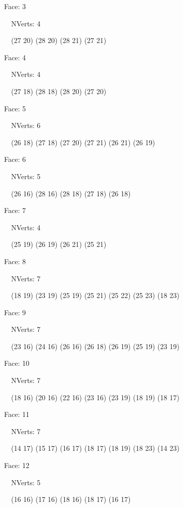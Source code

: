 \documentclass{article}
\begin{document}
{\footnotesize 

Face: 3

\   \    NVerts: 4

 \   \   (27 20) (28 20) (28 21) (27 21)}

{\footnotesize 

Face: 4

\   \    NVerts: 4

 \   \   (27 18) (28 18) (28 20) (27 20)}

{\footnotesize 

Face: 5

\   \    NVerts: 6

 \   \   (26 18) (27 18) (27 20) (27 21) (26 21) (26 19)}

{\footnotesize 

Face: 6

\   \    NVerts: 5

 \   \   (26 16) (28 16) (28 18) (27 18) (26 18)}

{\footnotesize 

Face: 7

\   \    NVerts: 4

 \   \   (25 19) (26 19) (26 21) (25 21)}

{\footnotesize 

Face: 8

\   \    NVerts: 7

 \   \   (18 19) (23 19) (25 19) (25 21) (25 22) (25 23) (18 23)}

{\footnotesize 

Face: 9

\   \    NVerts: 7

 \   \   (23 16) (24 16) (26 16) (26 18) (26 19) (25 19) (23 19)}

{\footnotesize 

Face: 10

\   \    NVerts: 7

 \   \   (18 16) (20 16) (22 16) (23 16) (23 19) (18 19) (18 17)}

{\footnotesize 

Face: 11

\   \    NVerts: 7

 \   \   (14 17) (15 17) (16 17) (18 17) (18 19) (18 23) (14 23)}

{\footnotesize 

Face: 12

\   \    NVerts: 5

 \   \   (16 16) (17 16) (18 16) (18 17) (16 17)}
\end{document}
